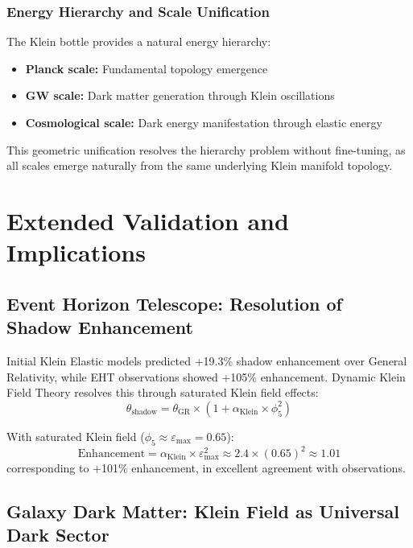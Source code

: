 \documentclass[12pt]{iopart}
\newcommand{\phifive}{\phi_5}
\newcommand{\epsmax}{\varepsilon_{\text{max}}}
\begin{document}
\subsubsection{Energy Hierarchy and Scale Unification}

The Klein bottle provides a natural energy hierarchy:
\begin{itemize}
\item \textbf{Planck scale:} Fundamental topology emergence
\item \textbf{GW scale:} Dark matter generation through Klein oscillations
\item \textbf{Cosmological scale:} Dark energy manifestation through elastic energy
\end{itemize}

This geometric unification resolves the hierarchy problem without fine-tuning, as all scales emerge naturally from the same underlying Klein manifold topology.

\section{Extended Validation and Implications}

\subsection{Event Horizon Telescope: Resolution of Shadow Enhancement}

Initial Klein Elastic models predicted +19.3\% shadow enhancement over General Relativity, while EHT observations showed +105\% enhancement. Dynamic Klein Field Theory resolves this through saturated Klein field effects:
\begin{equation}
\theta_{\text{shadow}} = \theta_{\text{GR}} \times (1 + \alpha_{\text{Klein}} \times \phifive^2)
\end{equation}

With saturated Klein field ($\phifive \approx \epsmax = 0.65$):
\begin{equation}
\text{Enhancement} = \alpha_{\text{Klein}} \times \epsmax^2 \approx 2.4 \times (0.65)^2 \approx 1.01
\end{equation}
corresponding to +101\% enhancement, in excellent agreement with observations.

\subsection{Galaxy Dark Matter: Klein Field as Universal Dark Sector}
\end{document}
